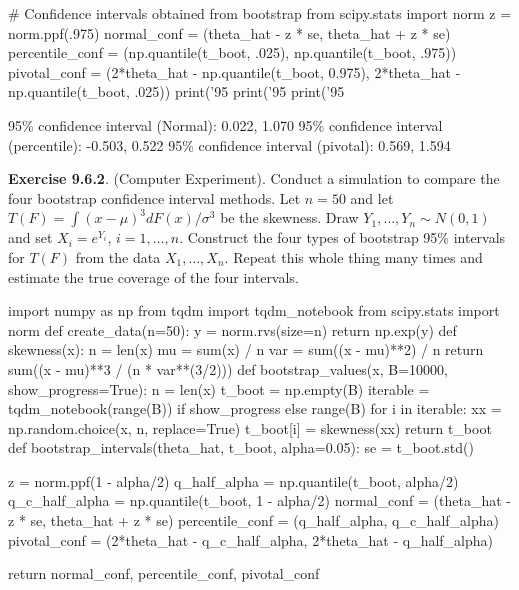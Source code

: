 \begin{python}
# Confidence intervals obtained from bootstrap
from scipy.stats import norm
z = norm.ppf(.975)
normal_conf = (theta_hat - z * se, theta_hat + z * se)
percentile_conf = (np.quantile(t_boot, .025), np.quantile(t_boot, .975))
pivotal_conf = (2*theta_hat - np.quantile(t_boot, 0.975), 
                2*theta_hat - np.quantile(t_boot, .025))
print('95%
print('95%
print('95%
\end{python}
\begin{console}
95\% confidence interval (Normal):        0.022, 1.070
95\% confidence interval (percentile):    -0.503, 0.522
95\% confidence interval (pivotal):       0.569, 1.594
\end{console}

\textbf{Exercise 9.6.2}. (Computer Experiment). Conduct a simulation to
compare the four bootstrap confidence interval methods.
Let \(n = 50\) and let \(T(F) = \int (x - \mu)^{3} dF(x) / \sigma^{3}\) be
the skewness. Draw \(Y_{1}, \dots, Y_{n} \sim N(0, 1)\) and set
\(X_{i} = e^{Y_{i}}\), \(i = 1, \dots, n\). Construct the four types of
bootstrap 95\% intervals for \(T(F)\) from the data \(X_{1}, \dots, X_{n}\).
Repeat this whole thing many times and estimate the true coverage of the
four intervals.

\begin{python}
import numpy as np
from tqdm import tqdm_notebook
from scipy.stats import norm
def create_data(n=50):
    y = norm.rvs(size=n)
    return np.exp(y)
def skewness(x):
    n = len(x)
    mu = sum(x) / n
    var = sum((x - mu)**2) / n
    return sum((x - mu)**3 / (n * var**(3/2)))
def bootstrap_values(x, B=10000, show_progress=True):
    n = len(x)
    t_boot = np.empty(B)
    iterable = tqdm_notebook(range(B)) if show_progress else range(B)
    for i in iterable:
        xx = np.random.choice(x, n, replace=True)
        t_boot[i] = skewness(xx)
    return t_boot
def bootstrap_intervals(theta_hat, t_boot, alpha=0.05):
    se = t_boot.std()
    
    z = norm.ppf(1 - alpha/2)
    q_half_alpha = np.quantile(t_boot, alpha/2)
    q_c_half_alpha = np.quantile(t_boot, 1 - alpha/2)
    normal_conf = (theta_hat - z * se, theta_hat + z * se)
    percentile_conf = (q_half_alpha, q_c_half_alpha)
    pivotal_conf = (2*theta_hat - q_c_half_alpha, 2*theta_hat - q_half_alpha)
    
    return normal_conf, percentile_conf, pivotal_conf
\end{python}

